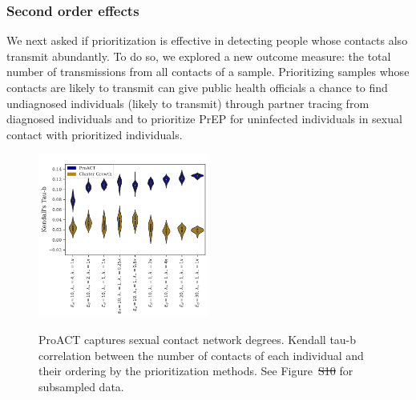 \documentclass[a4paper,11pt]{article}
\newcommand{\PLWH}{sample\xspace}
\providecommand{\DIFadd}[1]{{\protect\color{blue}\uwave{#1}}} %
\providecommand{\DIFdel}[1]{{\protect\color{red}\sout{#1}}}                      %
\providecommand{\DIFaddFL}[1]{\DIFadd{#1}} %
\providecommand{\DIFdelFL}[1]{\DIFdel{#1}} %
\providecommand{\DIFaddbeginFL}{} %
\providecommand{\DIFaddendFL}{} %
\providecommand{\DIFdelbeginFL}{} %
\providecommand{\DIFdelendFL}{} %
\begin{document}
\subsubsection{Second order effects}
We next asked if prioritization is effective in detecting people whose contacts also transmit abundantly. 
To do so, we explored a new outcome measure: the total number of transmissions from all contacts of a \PLWH. 
Prioritizing \PLWH{s} whose contacts are likely to transmit can give public health officials a chance to find undiagnosed individuals (likely to transmit) through partner tracing from diagnosed individuals and to  prioritize PrEP for uninfected individuals in sexual contact with prioritized individuals. 



\begin{figure}[!tp]
\centering
{\footnotesize
\includegraphics[width=0.5\textwidth]{figs/Fig4.pdf}%
\\
}
\caption{ProACT captures sexual contact network degrees.
 Kendall tau-b correlation between the number of contacts of each individual and their ordering by the prioritization methods.
 See Figure~\DIFdelbeginFL \DIFdelFL{S10 }\DIFdelendFL \DIFaddbeginFL \DIFaddFL{S12 }\DIFaddendFL for subsampled data. 
 }
\label{fig:efficacy-conc}
\end{figure}
\end{document}
